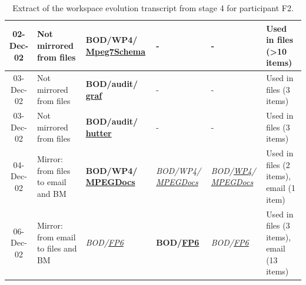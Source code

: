 \begin{table}[hbtp]
\begin{center}
\begin{footnotesize}
\begin{tabular}{|c|p{2.5cm}|p{2cm}|p{2cm}|p{2cm}|p{2.5cm}|}
\hline
 02-Dec-02 & Not mirrored from files & {\bf BOD/WP4/ \underline{Mpeg7Schema}} &            - &          - & Used in files (>10 items) \\
\hline
 03-Dec-02 & Not mirrored from files & {\bf BOD/audit/ \underline{graf}} &          - &          - & Used in files (3 items) \\
\hline
 03-Dec-02 & Not mirrored from files & {\bf BOD/audit/ \underline{hutter}} &          - &          - & Used in files (3 items) \\
\hline
 04-Dec-02 & Mirror: from files to email and BM & {\bf BOD/WP4/ \underline{MPEGDocs}} & {\it BOD/WP4/ \underline{MPEGDocs}} & {\it BOD/\underline{WP4}/ \underline{MPEGDocs}} & Used in files (2 items), email (1 item) \\
\hline
 06-Dec-02 & Mirror: from email to files and BM & {\it BOD/\underline{FP6}} & {\bf BOD/\underline{FP6}} & {\it BOD/\underline{FP6}} & Used in files (3 items), email (13 items) \\
\hline
\end{tabular}  
\end{footnotesize}
\caption{Extract of the workspace evolution transcript from stage 4 for participant F2.}
\label{table:main-study:wet-example}
\end{center}
\end{table}
\normalsize



